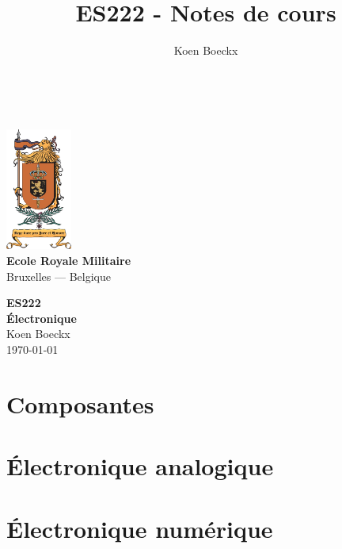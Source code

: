 \documentclass[a4paper,11pt]{book}
\title{ES222 - Notes de cours}
\author{Koen Boeckx}
\begin{document}
	
\thispagestyle{empty}
~
\vspace{-2cm}
\begin{center}
	\includegraphics[height=4cm]{erm.jpg}\\[0.5cm]
	{\bf\huge{Ecole Royale Militaire}}\\[0.1cm]
	\Large{Bruxelles --- Belgique}
\end{center}
\vfill
\vfill
\begin{center}
	{\bf\Huge{ES222\\[0.2cm] Électronique}}\\[0.3cm]
	
	{\Large Koen Boeckx} \\[0.1cm]
	\vspace{0.6cm}
	{\large \today}
\end{center}
\vfill
\vfill
\vfill

\newpage


\tableofcontents
\nocite{*} %


\part{Composantes}



\part{Électronique analogique}



%




\part{Électronique numérique}



\end{document}
